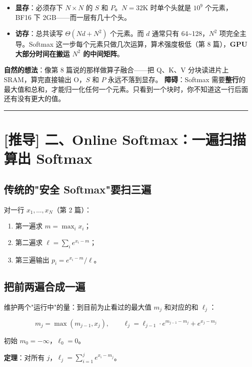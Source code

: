 \begin{itemize}
  \item \textbf{显存}：必须存下 $N \times N$ 的 $S$ 和 $P$。$N = 32\text{K}$ 时单个头就是 $10^9$ 个元素，BF16 下 2GB——而一层有几十个头。
  \item \textbf{访存}：总共读写 $\Theta(Nd + N^2)$ 个元素。而 $d$ 通常只有 64\textasciitilde{}128，$N^2$ 项完全主导。Softmax 这一步每个元素只做几次运算，算术强度极低（第 8 篇），\textbf{GPU 大部分时间在搬运 $N^2$ 的中间矩阵}。
\end{itemize}

\textbf{自然的想法}：像第 8 篇说的那样做算子融合——把 Q、K、V 分块读进片上 SRAM，算完直接输出 O，$S$ 和 $P$ 永远不落到显存。
\textbf{障碍}：Softmax 需要\textbf{整行}的最大值和总和，才能归一化任何一个元素。只看到一个块时，你不知道这一行后面还有没有更大的值。

\vspace{0.8em}\hrule\vspace{0.8em}

\section{[推导] 二、Online Softmax：一遍扫描算出 Softmax}

\subsection{传统的"安全 Softmax"要扫三遍}

对一行 $x_1, \dots, x_N$（第 2 篇）：
\begin{enumerate}
  \item 第一遍求 $m = \max_i x_i$；
  \item 第二遍求 $\ell = \sum_i e^{x_i - m}$；
  \item 第三遍输出 $p_i = e^{x_i - m} / \ell$。
\end{enumerate}

\subsection{把前两遍合成一遍}

维护两个"运行中"的量：到目前为止看过的最大值 $m_j$ 和对应的和 $\ell_j$：

\[
m_j = \max(m_{j-1}, x_j), \qquad \ell_j = \ell_{j-1} \cdot e^{m_{j-1} - m_j} + e^{x_j - m_j}
\]

初始 $m_0 = -\infty$，$\ell_0 = 0$。

\textbf{定理}：对所有 $j$，$\ell_j = \sum_{i=1}^{j} e^{x_i - m_j}$。

